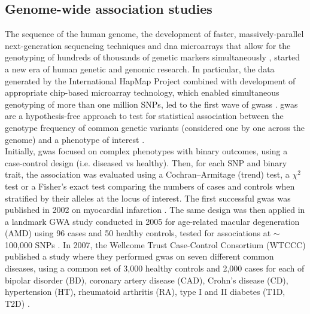 \subsection{Genome-wide association studies}
\label{sec:gwas}

The sequence of the human genome, the development of faster, massively-parallel next-generation sequencing techniques 
and \gls{dna} microarrays that allow for the genotyping of hundreds of thousands of genetic markers simultaneously \cite{wang1998large}, started a new era of human genetic and genomic research.
In particular, the data generated by the International HapMap Project combined with development of appropriate chip-based microarray technology, which enabled simultaneous genotyping of more than one million SNPs, led to the first wave of \glspl{gwas} \cite{visscher2012five}.
\gls{gwas} are a hypothesis-free approach to test for statistical association between the genotype frequency of common genetic variants (considered one by one across the genome) and a phenotype of interest \cite{mccarthy2008genome}. \\

Initially, \gls{gwas} focused on complex phenotypes with binary outcomes, using a case-control design (i.e. diseased vs healthy).
Then, for each SNP and binary trait, the association was evaluated using a Cochran–Armitage (trend) test, a $\chi^2$ test or a Fisher's exact test comparing the numbers of cases and controls when stratified by their alleles at the locus of interest. 
The first successful \gls{gwas} was published in 2002 on myocardial infarction \cite{ozaki2002functional}.
The same design was then applied in a landmark GWA study conducted in 2005 for age-related macular degeneration (AMD) using 96 cases and 50 healthy controls, tested for associations at $\sim$100,000 SNPs \cite{klein2005complement}. 
In 2007, the Wellcome Trust Case-Control Consortium (WTCCC) published a study where they performed \gls{gwas} on seven different common diseases, using a common set of 3,000 healthy controls and 2,000 cases for each of bipolar disorder (BD), coronary artery disease (CAD), Crohn's disease (CD), hypertension (HT), rheumatoid arthritis (RA), type I and II diabetes (T1D, T2D) \cite{wellcome2007genome}.\\

